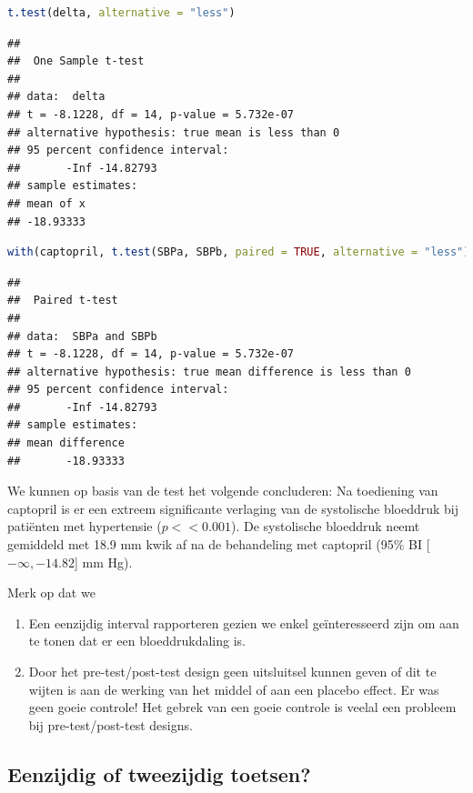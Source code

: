 \documentclass[
  12pt,dutch,coursenotes]{book}
\providecommand{\tightlist}{%
  \setlength{\itemsep}{0pt}\setlength{\parskip}{0pt}}
\begin{document}
\begin{lstlisting}[language=R]
t.test(delta, alternative = "less")
\end{lstlisting}

\begin{lstlisting}
## 
##  One Sample t-test
## 
## data:  delta
## t = -8.1228, df = 14, p-value = 5.732e-07
## alternative hypothesis: true mean is less than 0
## 95 percent confidence interval:
##       -Inf -14.82793
## sample estimates:
## mean of x 
## -18.93333
\end{lstlisting}

\begin{lstlisting}[language=R]
with(captopril, t.test(SBPa, SBPb, paired = TRUE, alternative = "less"))
\end{lstlisting}

\begin{lstlisting}
## 
##  Paired t-test
## 
## data:  SBPa and SBPb
## t = -8.1228, df = 14, p-value = 5.732e-07
## alternative hypothesis: true mean difference is less than 0
## 95 percent confidence interval:
##       -Inf -14.82793
## sample estimates:
## mean difference 
##       -18.93333
\end{lstlisting}

We kunnen op basis van de test het volgende concluderen:
Na toediening van captopril is er een extreem significante verlaging van de systolische bloeddruk bij patiënten met hypertensie
(\(p << 0.001\)). De systolische bloeddruk neemt gemiddeld met 18.9 mm kwik af na de behandeling met captopril (95\% BI {[}\(-\infty,-14.82\){]} mm Hg).

Merk op dat we

\begin{enumerate}
\def\labelenumi{\arabic{enumi}.}
\tightlist
\item
  Een eenzijdig interval rapporteren gezien we enkel geïnteresseerd zijn om aan te tonen dat er een bloeddrukdaling is.
\item
  Door het pre-test/post-test design geen uitsluitsel kunnen geven of dit te wijten is aan de werking van het middel of aan een placebo effect. Er was geen goeie controle! Het gebrek van een goeie controle is veelal een probleem bij pre-test/post-test designs.
\end{enumerate}

\hypertarget{eenzijdig-of-tweezijdig-toetsen}{%
\subsection{Eenzijdig of tweezijdig toetsen?}\label{eenzijdig-of-tweezijdig-toetsen}}
\end{document}
